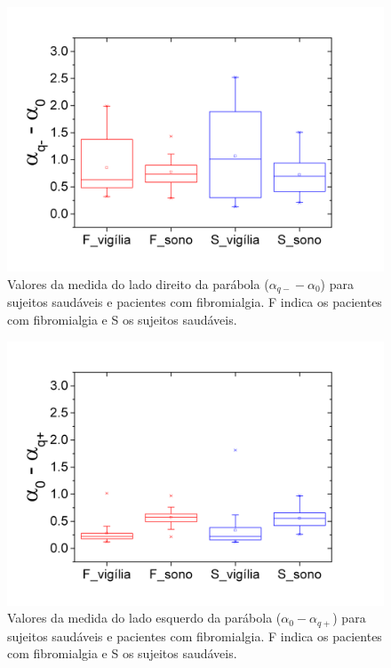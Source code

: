\documentclass{ufscThesis}
\begin{document}
\begin{figure}[!h]
\centering
\includegraphics[scale=0.3]{dir_boxplot.png}
\caption{Valores da medida do lado direito da parábola ($\alpha_{q-} - \alpha_{0}$)  para sujeitos saudáveis e pacientes com fibromialgia. F indica os pacientes com fibromialgia e S os sujeitos saudáveis.}
\label{dir_boxplot}
\end{figure}

\begin{figure}[!h]
\centering
\includegraphics[scale=0.3]{esq_boxplot.png}
\caption{Valores da medida do lado esquerdo da parábola ($\alpha_{0} - \alpha_{q+}$)  para sujeitos saudáveis e pacientes com fibromialgia. F indica os pacientes com fibromialgia e S os sujeitos saudáveis.}
\label{esq_boxplot}
\end{figure}
\end{document}
